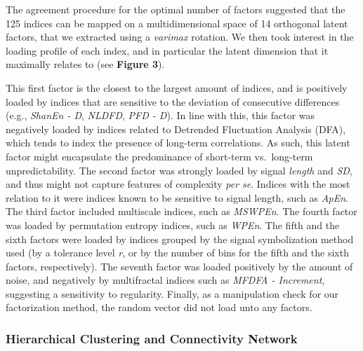\documentclass[
  man]{apa6}
\begin{document}
The agreement procedure for the optimal number of factors suggested that the 125 indices can be mapped on a multidimensional space of 14 orthogonal latent factors, that we extracted using a \emph{varimax} rotation. We then took interest in the loading profile of each index, and in particular the latent dimension that it maximally relates to (see \textbf{Figure 3}).

This first factor is the closest to the largest amount of indices, and is positively loaded by indices that are sensitive to the deviation of consecutive differences (e.g., \emph{ShanEn - D}, \emph{NLDFD}, \emph{PFD - D}). In line with this, this factor was negatively loaded by indices related to Detrended Fluctuation Analysis (DFA), which tends to index the presence of long-term correlations. As such, this latent factor might encapsulate the predominance of short-term vs.~long-term unpredictability.
The second factor was strongly loaded by signal \emph{length} and \emph{SD}, and thus might not capture features of complexity \emph{per se}. Indices with the most relation to it were indices known to be sensitive to signal length, such as \emph{ApEn}.
The third factor included multiscale indices, such as \emph{MSWPEn}.
The fourth factor was loaded by permutation entropy indices, such as \emph{WPEn}.
The fifth and the sixth factors were loaded by indices grouped by the signal symbolization method used (by a tolerance level \emph{r}, or by the number of bins for the fifth and the sixth factors, respectively).
The seventh factor was loaded positively by the amount of noise, and negatively by multifractal indices such as \emph{MFDFA - Increment}, suggesting a sensitivity to regularity.
Finally, as a manipulation check for our factorization method, the random vector did not load unto any factors.

\hypertarget{hierarchical-clustering-and-connectivity-network}{%
\subsubsection{Hierarchical Clustering and Connectivity Network}\label{hierarchical-clustering-and-connectivity-network}}
\end{document}
